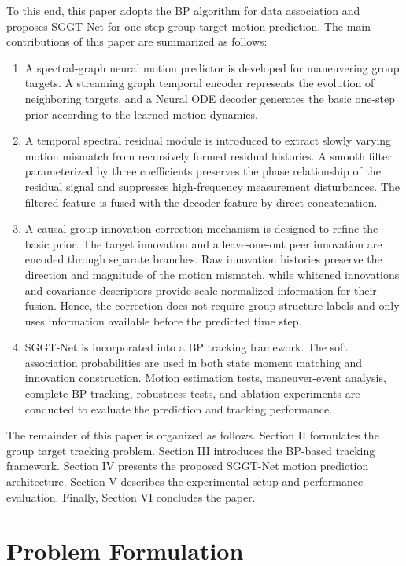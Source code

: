 \documentclass[10pt,doublecolumn]{IEEEtaes}
\begin{document}
To this end, this paper adopts the BP algorithm for data association and proposes SGGT-Net for one-step group target motion prediction. The main contributions of this paper are summarized as follows:
\begin{enumerate}
\item A spectral-graph neural motion predictor is developed for maneuvering group targets. A streaming graph temporal encoder represents the evolution of neighboring targets, and a Neural ODE decoder generates the basic one-step prior according to the learned motion dynamics.

\item A temporal spectral residual module is introduced to extract slowly varying motion mismatch from recursively formed residual histories. A smooth filter parameterized by three coefficients preserves the phase relationship of the residual signal and suppresses high-frequency measurement disturbances. The filtered feature is fused with the decoder feature by direct concatenation.

\item A causal group-innovation correction mechanism is designed to refine the basic prior. The target innovation and a leave-one-out peer innovation are encoded through separate branches. Raw innovation histories preserve the direction and magnitude of the motion mismatch, while whitened innovations and covariance descriptors provide scale-normalized information for their fusion. Hence, the correction does not require group-structure labels and only uses information available before the predicted time step.

\item SGGT-Net is incorporated into a BP tracking framework. The soft association probabilities are used in both state moment matching and innovation construction. Motion estimation tests, maneuver-event analysis, complete BP tracking, robustness tests, and ablation experiments are conducted to evaluate the prediction and tracking performance.
\end{enumerate}

The remainder of this paper is organized as follows. Section II formulates the group target tracking problem. Section III introduces the BP-based tracking framework. Section IV presents the proposed SGGT-Net motion prediction architecture. Section V describes the experimental setup and performance evaluation. Finally, Section VI concludes the paper.

\section{Problem Formulation}
\end{document}
